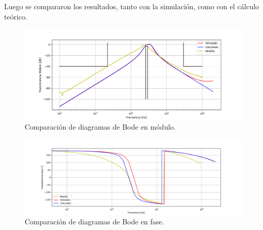 Luego se compararon los resultados, tanto con la simulación, como con el cálculo teórico.
\begin{figure}[H]
	\centering
	\includegraphics[width=\textwidth]{Imagenes-Ej2/BodeRauchCalcsim.png}
	\caption{Comparación de diagramas de Bode en módulo.}
	\label{fig:Bodecalcsim1}
\end{figure}
\begin{figure}[H]
	\centering
	\includegraphics[width=\textwidth]{Imagenes-Ej2/BodeRauchCalcsimF.png}
	\caption{Comparación de diagramas de Bode en fase.}
	\label{fig:Bodecalcsimf1}
\end{figure}


